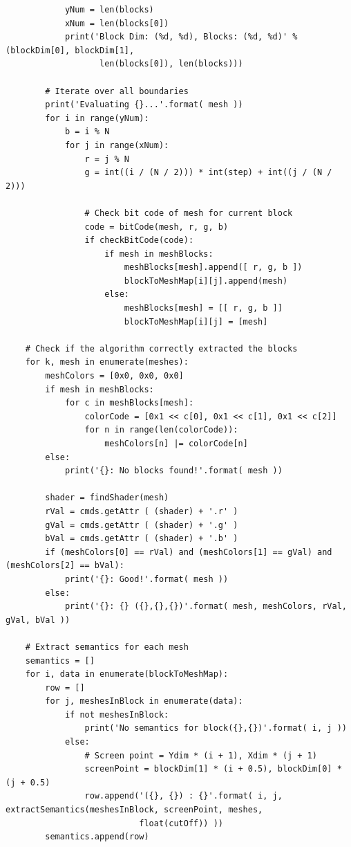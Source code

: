 \documentclass[conference]{IEEEtran}
\begin{document}
{\begin{verbatim}
            yNum = len(blocks)
            xNum = len(blocks[0])
            print('Block Dim: (%d, %d), Blocks: (%d, %d)' % (blockDim[0], blockDim[1],
                   len(blocks[0]), len(blocks)))
    
        # Iterate over all boundaries
        print('Evaluating {}...'.format( mesh ))
        for i in range(yNum):
            b = i % N
            for j in range(xNum):
                r = j % N
                g = int((i / (N / 2))) * int(step) + int((j / (N / 2)))
                            
                # Check bit code of mesh for current block
                code = bitCode(mesh, r, g, b)
                if checkBitCode(code):
                    if mesh in meshBlocks:
                        meshBlocks[mesh].append([ r, g, b ])
                        blockToMeshMap[i][j].append(mesh)
                    else:
                        meshBlocks[mesh] = [[ r, g, b ]]
                        blockToMeshMap[i][j] = [mesh]
                        
    # Check if the algorithm correctly extracted the blocks
    for k, mesh in enumerate(meshes):
        meshColors = [0x0, 0x0, 0x0]
        if mesh in meshBlocks:
            for c in meshBlocks[mesh]:
                colorCode = [0x1 << c[0], 0x1 << c[1], 0x1 << c[2]]
                for n in range(len(colorCode)):
                    meshColors[n] |= colorCode[n]
        else:
            print('{}: No blocks found!'.format( mesh ))
        
        shader = findShader(mesh)
        rVal = cmds.getAttr ( (shader) + '.r' )
        gVal = cmds.getAttr ( (shader) + '.g' )
        bVal = cmds.getAttr ( (shader) + '.b' )
        if (meshColors[0] == rVal) and (meshColors[1] == gVal) and (meshColors[2] == bVal):
            print('{}: Good!'.format( mesh ))
        else:
            print('{}: {} ({},{},{})'.format( mesh, meshColors, rVal, gVal, bVal ))
            
    # Extract semantics for each mesh
    semantics = []
    for i, data in enumerate(blockToMeshMap):
        row = []
        for j, meshesInBlock in enumerate(data):
            if not meshesInBlock:
                print('No semantics for block({},{})'.format( i, j ))
            else:
                # Screen point = Ydim * (i + 1), Xdim * (j + 1)
                screenPoint = blockDim[1] * (i + 0.5), blockDim[0] * (j + 0.5)
                row.append('({}, {}) : {}'.format( i, j, extractSemantics(meshesInBlock, screenPoint, meshes,
                           float(cutOff)) ))
        semantics.append(row)
    

\end{verbatim}}
\end{document}
